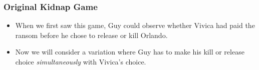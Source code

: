 
\begin{frame}
  \frametitle{Original Kidnap Game}
  \begin{figure}
    
  \end{figure}
\end{frame}

\begin{frame}
  \begin{itemize}

    \item When we first saw this game,
    Guy could observe whether Vivica had paid the ransom before he chose to release or kill Orlando.

    \item Now we will consider a variation
    where Guy has to make his kill or release choice 
    \textit{simultaneously} with Vivica's choice.

  \end{itemize}
\end{frame}
